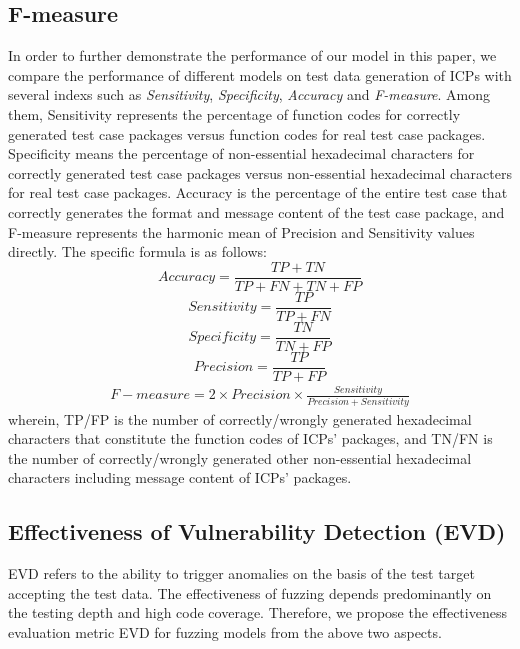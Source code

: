 \subsection{\textbf{F-measure}}
In order to further demonstrate the performance of our model in this paper, we compare the performance of different models on test data generation of ICPs with several indexs such as \textit{Sensitivity}, \textit{Specificity}, \textit{Accuracy} and \textit{F-measure}. Among them, Sensitivity represents the percentage of function codes for correctly generated test case packages versus function codes for real test case packages. Specificity means the percentage of non-essential hexadecimal characters for correctly generated test case packages versus non-essential hexadecimal characters for real test case packages. Accuracy is the percentage of the entire test case that correctly generates the format and message content of the test case package, and F-measure represents the harmonic mean of Precision and Sensitivity values directly. The specific formula is as follows:
\begin{equation}
Accuracy = \frac{{TP + TN}}{{TP + FN + TN + FP}}
\end{equation}
\begin{equation}
Sensitivity = \frac{{TP}}{{TP + FN}}
\end{equation}
\begin{equation}
Specificity = \frac{{TN}}{{TN + FP}}
\end{equation}
\begin{equation}
Precision = \frac{{TP}}{{TP + FP}}
\end{equation}
\begin{equation}
\begin{array}{l}
F-measure =\displaystyle{2 \times Precision \times} \displaystyle\frac{{Sensitivity}}{{Precision + Sensitivity}}
\end{array}
\end{equation}
wherein, TP/FP is the number of correctly/wrongly generated hexadecimal characters that constitute the function codes of ICPs' packages, and TN/FN is the number of correctly/wrongly generated other non-essential hexadecimal characters including message content of ICPs' packages.


\subsection{\textbf{Effectiveness of Vulnerability Detection (EVD)}}
EVD refers to the ability to trigger anomalies on the basis of the test target accepting the test data. The effectiveness of fuzzing depends predominantly on the testing depth and high code coverage. Therefore, we propose the effectiveness evaluation metric EVD for fuzzing models from the above two aspects.

